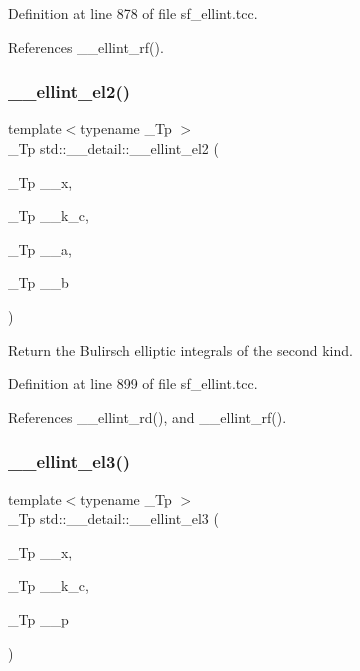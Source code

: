 Definition at line 878 of file sf\+\_\+ellint.\+tcc.



References \+\_\+\+\_\+ellint\+\_\+rf().

\mbox{\label{namespacestd_1_1____detail_a82449d0f05d40ba2cef6b8fc57dd5bae}} 
\subsubsection{\texorpdfstring{\+\_\+\+\_\+ellint\+\_\+el2()}{\_\_ellint\_el2()}}
{\footnotesize\ttfamily template$<$typename \+\_\+\+Tp $>$ \\
\+\_\+\+Tp std\+::\+\_\+\+\_\+detail\+::\+\_\+\+\_\+ellint\+\_\+el2 (\begin{DoxyParamCaption}\item[{\+\_\+\+Tp}]{\+\_\+\+\_\+x,  }\item[{\+\_\+\+Tp}]{\+\_\+\+\_\+k\+\_\+c,  }\item[{\+\_\+\+Tp}]{\+\_\+\+\_\+a,  }\item[{\+\_\+\+Tp}]{\+\_\+\+\_\+b }\end{DoxyParamCaption})}

Return the Bulirsch elliptic integrals of the second kind. 

Definition at line 899 of file sf\+\_\+ellint.\+tcc.



References \+\_\+\+\_\+ellint\+\_\+rd(), and \+\_\+\+\_\+ellint\+\_\+rf().

\mbox{\label{namespacestd_1_1____detail_a2a2b5b80edd39b3d1f852f10c5f277fc}} 
\subsubsection{\texorpdfstring{\+\_\+\+\_\+ellint\+\_\+el3()}{\_\_ellint\_el3()}}
{\footnotesize\ttfamily template$<$typename \+\_\+\+Tp $>$ \\
\+\_\+\+Tp std\+::\+\_\+\+\_\+detail\+::\+\_\+\+\_\+ellint\+\_\+el3 (\begin{DoxyParamCaption}\item[{\+\_\+\+Tp}]{\+\_\+\+\_\+x,  }\item[{\+\_\+\+Tp}]{\+\_\+\+\_\+k\+\_\+c,  }\item[{\+\_\+\+Tp}]{\+\_\+\+\_\+p }\end{DoxyParamCaption})}

